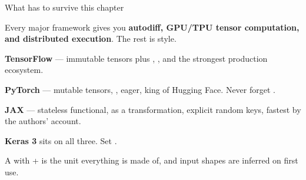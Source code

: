 \documentclass[aspectratio=169,11pt,t]{beamer}
\begin{document}
\begin{frame}[shrink=25]{What has to survive this chapter}
\begin{isteps}
\item Every major framework gives you \textbf{autodiff, GPU/TPU tensor computation, and distributed execution}. The rest is style.
\item \textbf{TensorFlow} --- immutable tensors plus , , and the strongest production ecosystem.
\item \textbf{PyTorch} --- mutable tensors, , eager, king of Hugging Face. Never forget .
\item \textbf{JAX} --- stateless functional,  as a transformation, explicit random keys, fastest by the authors' account.
\item \textbf{Keras 3} sits on all three. Set   .
\item A  with  +  is the unit everything is made of, and input shapes are inferred on first use.
\end{isteps}
\vskip 4pt
\vskip 2pt
\end{frame}
\end{document}

